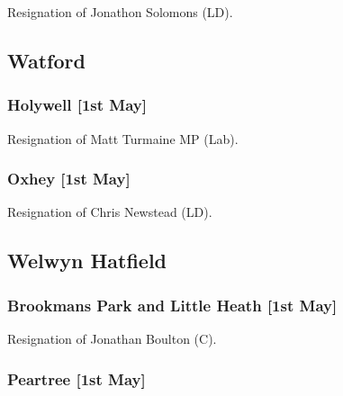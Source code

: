 \documentclass[a4paper,openany]{book}
\begin{document}
\begin{resultsiii}
Resignation of Jonathon Solomons (LD).

\subsection*{Watford}

\subsubsection*{Holywell \hspace*{\fill}\nolinebreak[1]%
	\enspace\hspace*{\fill}
	[1st May]}


Resignation of Matt Turmaine MP (Lab).

\subsubsection*{Oxhey \hspace*{\fill}\nolinebreak[1]%
	\enspace\hspace*{\fill}
	[1st May]}


Resignation of Chris Newstead (LD).

\subsection*{Welwyn Hatfield}

\subsubsection*{Brookmans Park and Little Heath \hspace*{\fill}\nolinebreak[1]%
	\enspace\hspace*{\fill}
	[1st May]}


Resignation of Jonathan Boulton (C).

\subsubsection*{Peartree \hspace*{\fill}\nolinebreak[1]%
	\enspace\hspace*{\fill}
	[1st May]}


\end{resultsiii}
\end{document}
